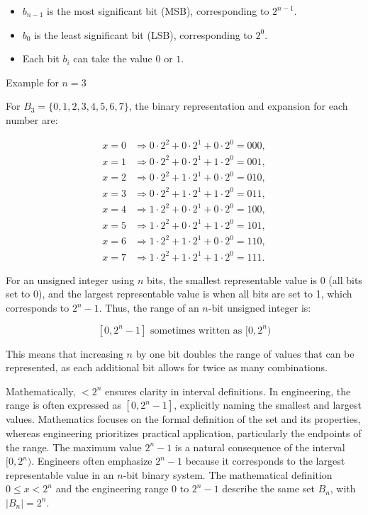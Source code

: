 \begin{itemize}
    \item \( b_{n-1} \) is the most significant bit (MSB), corresponding to \( 2^{n-1} \).
    \item \( b_0 \) is the least significant bit (LSB), corresponding to \( 2^0 \).
    \item Each bit \( b_i \) can take the value \( 0 \) or \( 1 \).
\end{itemize}

Example for \( n = 3 \)

For \( B_3 = \{0, 1, 2, 3, 4, 5, 6, 7\} \), the binary representation and expansion for each number are:

\[
\begin{aligned}
x = 0 & \Rightarrow 0 \cdot 2^2 + 0 \cdot 2^1 + 0 \cdot 2^0 = 000, \\
x = 1 & \Rightarrow 0 \cdot 2^2 + 0 \cdot 2^1 + 1 \cdot 2^0 = 001, \\
x = 2 & \Rightarrow 0 \cdot 2^2 + 1 \cdot 2^1 + 0 \cdot 2^0 = 010, \\
x = 3 & \Rightarrow 0 \cdot 2^2 + 1 \cdot 2^1 + 1 \cdot 2^0 = 011, \\
x = 4 & \Rightarrow 1 \cdot 2^2 + 0 \cdot 2^1 + 0 \cdot 2^0 = 100, \\
x = 5 & \Rightarrow 1 \cdot 2^2 + 0 \cdot 2^1 + 1 \cdot 2^0 = 101, \\
x = 6 & \Rightarrow 1 \cdot 2^2 + 1 \cdot 2^1 + 0 \cdot 2^0 = 110, \\
x = 7 & \Rightarrow 1 \cdot 2^2 + 1 \cdot 2^1 + 1 \cdot 2^0 = 111.
\end{aligned}
\]


For an unsigned integer using \( n \) bits, the smallest representable value is 0 (all bits set to 0), and the largest representable value is when all bits are set to 1, which corresponds to \( 2^n - 1 \). Thus, the range of an \( n \)-bit unsigned integer is:

\[
[0, 2^n - 1] \text{ sometimes written as } [0, 2^n)
\]

This means that increasing \( n \) by one bit doubles the range of values that can be represented, as each additional bit allows for twice as many combinations.

Mathematically, \( < 2^n \) ensures clarity in interval definitions. In engineering, the range is often expressed as \( [0, 2^n - 1] \), explicitly naming the smallest and largest values. Mathematics focuses on the formal definition of the set and its properties, whereas engineering prioritizes practical application, particularly the endpoints of the range. The maximum value \( 2^n - 1 \) is a natural consequence of the interval \( [0, 2^n) \). Engineers often emphasize \( 2^n - 1 \) because it corresponds to the largest representable value in an \( n \)-bit binary system. The mathematical definition \( 0 \leq x < 2^n \) and the engineering range \( 0 \text{ to } 2^n - 1 \) describe the same set \( B_n \), with \( |B_n| = 2^n \).

